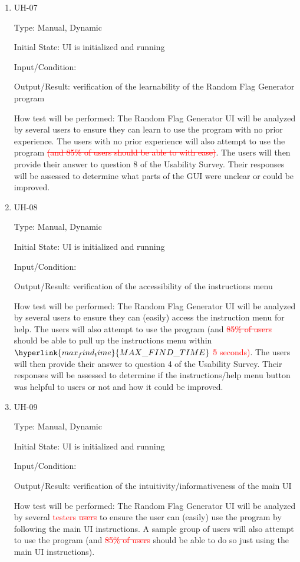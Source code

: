 \documentclass[12pt, titlepage]{article}
\begin{document}
\begin{enumerate}

\item{UH-07\\}

Type: Manual, Dynamic

Initial State: UI is initialized and running

Input/Condition: 

Output/Result: verification of the learnability of the Random Flag Generator
program

How test will be performed: The Random Flag Generator UI will be analyzed by
several users to ensure they can learn to use the program with no prior
experience. The users with no prior experience will also attempt to use the
program \textcolor{red}{\sout{(and 85\% of users should be able to with
ease)}}. The users will then provide their answer to question 8 of the
Usability Survey. Their responses will be assessed to determine what parts of
the GUI were unclear or could be improved.

\item{UH-08\\}

Type: Manual, Dynamic

Initial State: UI is initialized and running

Input/Condition: 

Output/Result: verification of the accessibility of the instructions menu

How test will be performed: The Random Flag Generator UI will be analyzed by
several users to ensure they can (easily) access the instruction menu for
help. The users will also attempt to use the program (and \textcolor{red}{
\sout{85\% of users}} should be able to pull up the instructions menu within
\textcolor{red}{$\hyperlink{max_find_time}{MAX\_FIND\_TIME}$ \sout{5}
seconds)}. The users will then provide their answer to question 4 of the
Usability Survey. Their responses will be assessed to determine if the
instructions/help menu button was helpful to users or not and how it could be
improved.

\item{UH-09\\}

Type: Manual, Dynamic

Initial State: UI is initialized and running

Input/Condition: 

Output/Result: verification of the intuitivity/informativeness of the main UI

How test will be performed: The Random Flag Generator UI will be analyzed by
several \textcolor{red}{testers \sout{users}} to ensure the user can (easily)
use the program by following the main UI instructions. A sample group of users
will also attempt to use the program (and \textcolor{red}{\sout{85\% of
users}} should be able to do so just using the main UI instructions).

\end{enumerate}
\end{document}
